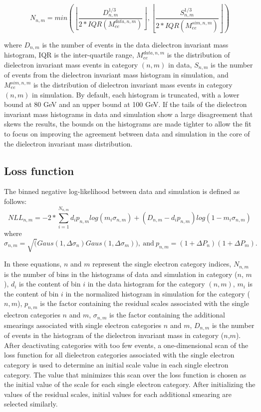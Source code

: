 \begin{equation}
    N_{n,m} = min( \left \lfloor{ \frac{D_{n,m}^{1/3}}{2*IQR(M_{ee}^{data,n,m})}} \right \rfloor, \left \lfloor{ \frac{S_{n,m}^{1/3}}{2*IQR(M_{ee}^{sim,n,m})}} \right \rfloor )
\end{equation}

\noindent where $D_{n,m}$ is the number of events in the data dielectron invariant mass histogram, IQR is the inter-quartile range, $M_{ee}^{data,n,m}$ is the distribution of dielectron invariant mass events in category $(n,m)$ in data, $S_{n,m}$ is the number of events from the dielectron invariant mass histogram in simulation, and $M_{ee}^{sim,n,m}$ is the distribution of dielectron invariant mass events in category $(n,m)$ in simulation.
By default, each histogram is truncated, with a lower bound at 80 GeV and an upper bound at 100 GeV. If the tails of the dielectron invariant mass histograms in data and simulation show a large disagreement that skews the results, the bounds on the histograms are made tighter to allow the fit to focus on improving the agreement between data and simulation in the core of the dielectron invariant mass distribution. 

\subsection{Loss function}

The binned negative log-likelihood between data and simulation is defined as follows:
\begin{equation}
    NLL_{n,m} = -2 * \sum_{i = 1}^{N_{n,m}} d_{i} p_{n,m} log(m_{i} \sigma_{n,m}) + (D_{n,m} - d_{i} p_{n,m})  log(1 - m_{i} \sigma_{n,m})
\end{equation}
where
\begin{equation}
    \sigma_{n,m} = \sqrt( Gaus(1, \Delta\sigma_{n}) Gaus(1, \Delta\sigma_{m}) ) \mathrm{,\ and\ } p_{n,m} = (1+\Delta P_{n})(1+\Delta P_{m}).
\end{equation}

In these equations, $n$ and $m$ represent the single electron category indices, $N_{n,m}$ is the number of bins in the histograms of data and simulation in category ($n$, $m$), $d_i$ is the content of bin $i$ in the data histogram for the category $(n,m)$, $m_i$ is the content of bin $i$ in the normalized histogram in simulation for the category ($n,m$), $p_{n,m}$ is the factor containing the residual scales associated with the single electron categories $n$ and $m$, $\sigma_{n,m}$ is the factor containing the additional smearings associated with single electron categories $n$ and $m$, $D_{n,m}$ is the number of events in the histogram of the dielectron invariant mass in category ($n$,$m$).
After deactivating categories with too few events, a one-dimensional scan of the loss function for all dielectron categories associated with the single electron category is used to determine an initial scale value in each single electron category. The value that minimizes this scan over the loss function is chosen as the initial value of the scale for each single electron category. After initializing the values of the residual scales, initial values for each additional smearing are selected similarly.

